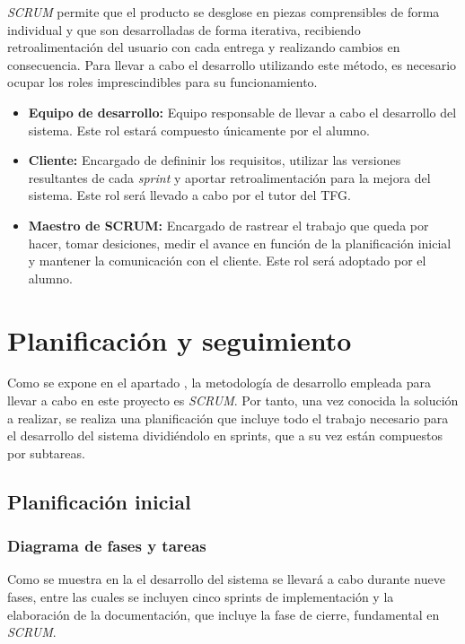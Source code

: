 \documentclass[12pt]{article}
\begin{document}
    \textit{SCRUM} permite que el producto se desglose en piezas comprensibles de forma individual y que son desarrolladas de forma iterativa, recibiendo retroalimentación del usuario con cada entrega y realizando cambios en consecuencia. Para llevar a cabo el desarrollo utilizando este método, es necesario ocupar los roles imprescindibles para su funcionamiento.

    \begin{itemize}
        \item \textbf{Equipo de desarrollo:} Equipo responsable de llevar a cabo el desarrollo del sistema. Este rol estará compuesto únicamente por el alumno.
        \item \textbf{Cliente:} Encargado de defininir los requisitos, utilizar las versiones resultantes de cada \textit{sprint} y aportar retroalimentación para la mejora del sistema. Este rol será llevado a cabo por el tutor del TFG.
        \item \textbf{Maestro de SCRUM:} Encargado de rastrear el trabajo que queda por hacer, tomar desiciones, medir el avance en función de la planificación inicial y mantener la comunicación con el cliente. Este rol será adoptado por el alumno.
    \end{itemize}

\section{Planificación y seguimiento}
    Como se expone en el apartado , la metodología de desarrollo empleada para llevar a cabo en este proyecto es \textit{SCRUM}. Por tanto, una vez conocida la solución a realizar, se realiza una planificación que incluye todo el trabajo necesario para el desarrollo del sistema dividiéndolo en sprints, que a su vez están compuestos por subtareas.

    \subsection{Planificación inicial}
        \subsubsection{Diagrama de fases y tareas}
        Como se muestra en la  el desarrollo del sistema se llevará a cabo durante nueve fases, entre las cuales se incluyen cinco sprints de implementación y la elaboración de la documentación, que incluye la fase de cierre, fundamental en \textit{SCRUM}.
\end{document}
